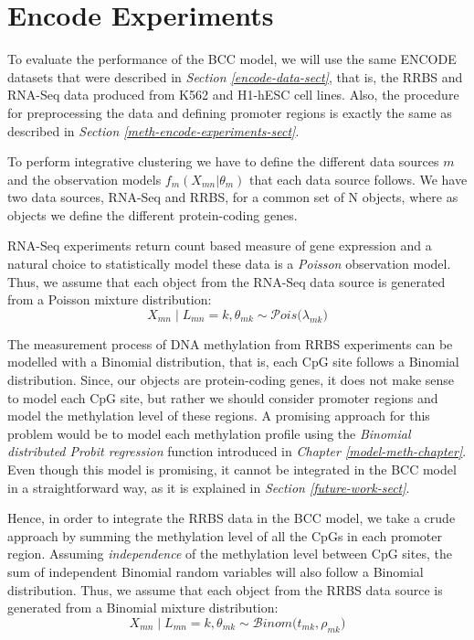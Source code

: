\section{Encode Experiments} \label{integr-encode-exper-sect}
To evaluate the performance of the BCC model, we will use the same ENCODE datasets that were described in \emph{Section \ref{encode-data-sect}}, that is, the RRBS and RNA-Seq data produced from K562 and H1-hESC cell lines. Also, the procedure for preprocessing the data and defining promoter regions is exactly the same as described in \emph{Section \ref{meth-encode-experiments-sect}}. 

To perform integrative clustering we have to define the different data sources $m$ and the observation models $f_{m}(X_{mn}|\theta_{m})$ that each data source follows. We have two data sources, RNA-Seq and RRBS, for a common set of N objects, where as objects we define the different protein-coding genes.

RNA-Seq experiments return count based measure of gene expression and a natural choice to statistically model these data is a \emph{Poisson} observation model. Thus, we assume that each object from the RNA-Seq data source is generated from a Poisson mixture distribution:
\begin{equation}
	X_{mn} \mid L_{mn} = k, \theta_{mk} \sim \mathcal{P}ois\big(\lambda_{mk}\big)
\end{equation}

The measurement process of DNA methylation from RRBS experiments can be modelled with a Binomial distribution, that is, each CpG site follows a Binomial distribution. Since, our objects are protein-coding genes, it does not make sense to model each CpG site, but rather we should consider promoter regions and model the methylation level of these regions. A promising approach for this problem would be to model each methylation profile using the \emph{Binomial distributed Probit regression} function introduced in \emph{Chapter \ref{model-meth-chapter}}. Even though this model is promising, it cannot be integrated in the BCC model in a straightforward way, as it is  explained in \emph{Section \ref{future-work-sect}}.

Hence, in order to integrate the RRBS data in the BCC model, we take a crude approach by summing the methylation level of all the CpGs in each promoter region. Assuming \emph{independence} of the methylation level between CpG sites, the sum of independent Binomial random variables will also follow a Binomial distribution. Thus, we assume that each object from the RRBS data source is generated from a Binomial mixture distribution:
\begin{equation}
	X_{mn} \mid L_{mn} = k, \theta_{mk} \sim \mathcal{B}inom\big(t_{mk}, \rho_{mk}\big)
\end{equation}

